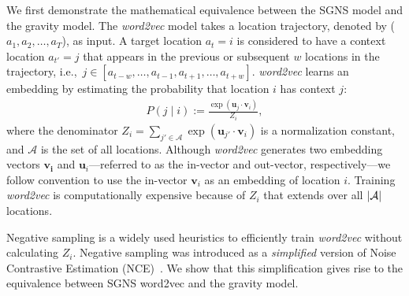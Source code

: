 \documentclass[12pt]{article} %
\def\given{\mid}
\def\ie{i.e.,~}
\begin{document}
We first demonstrate the mathematical equivalence between the SGNS model and the gravity model.
The {\it word2vec} model takes a location trajectory, denoted by ($a_{1}, a_{2}, \ldots, a_{T}$), as input.
A target location $a_t=i$ is considered to have a context location $a_{t'}=j$ that appears in the previous or subsequent $w$ locations in the trajectory, \ie  $j \in [a_{t-w}, \ldots, a_{t-1}, a_{t+1},\ldots, a_{t+w}]$.
	{\it word2vec} learns an embedding by estimating the probability that location $i$ has context $j$:
\begin{align}
	P\left(j \given i \right):= \frac{\exp(\bm{u}_j \cdot \bm{v}_{i})}{Z_i}, \label{eq:prob_w2v_ng}
\end{align}
where the denominator $Z_i=\sum_{j' \in \mathcal{A}} \exp(\bm{u}_{j'} \cdot \bm{v}_{i})$ is a normalization constant, and $\mathcal{A}$ is the set of all locations.
Although {\it word2vec} generates two embedding vectors $\bm{v_i}$ and $\bm{u}_i$---referred to as the in-vector and out-vector, respectively---we follow convention to use the in-vector $\bm{v}_i$ as an embedding of location $i$.
Training {\it word2vec} is computationally expensive because of $Z_i$ that extends over all $|{\cal A}|$ locations.

Negative sampling is a widely used heuristics to efficiently train {\it word2vec} without calculating $Z_i$.
Negative sampling was introduced as a \textit{simplified} version of Noise Contrastive Estimation (NCE)~\autocite{mikolov2013word2vec,Gutmann2010}. 
We show that this simplification gives rise to the equivalence between SGNS word2vec and the gravity model. 
\end{document}

